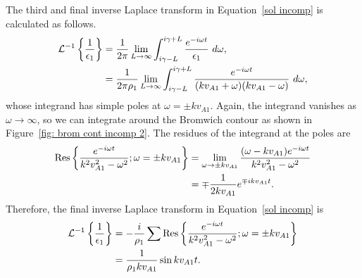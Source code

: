 \documentclass[12pt]{../style-files/ociamthesis}
\begin{document}
The third and final inverse Laplace transform in Equation~\eqref{sol incomp} is calculated as follows.
\begin{align}
\mathcal{L}^{-1}\left\{ \frac{1}{\epsilon_1} \right\} &= \frac{1}{2\pi}\lim_{L \to \infty} \int_{i\gamma - L}^{i\gamma + L} \frac{e^{-i\omega t}}{\epsilon_1} ~d\omega, \notag \\
&= \frac{1}{2\pi\rho_1}\lim_{L \to \infty} \int_{i\gamma - L}^{i\gamma + L} \frac{e^{-i\omega t}}{(kv_{A1} + \omega)(kv_{A1} - \omega)} ~d\omega,
\end{align}
whose integrand has simple poles at $\omega = \pm k v_{A1}$. Again, the integrand vanishes as $\omega \to \infty$, so we can integrate around the Bromwich contour as shown in Figure~\ref{fig: brom cont incomp 2}. The residues of the integrand at the poles are
\begin{align}
\mathrm{Res}\left\{\frac{e^{-i\omega t}}{k^2v_{A1}^2 - \omega^2}; \omega = \pm kv_{A1} \right\} &= 
\lim_{\omega \to \pm kv_{A1}} \frac{(\omega - kv_{A1}) e^{-i\omega t}}{k^2v_{A1}^2 - \omega^2} \notag \\ 
&= \mp \frac{1}{2kv_{A1}} e^{\mp ikv_{A1} t}.
\end{align}
Therefore, the final inverse Laplace transform in Equation~\eqref{sol incomp} is
\begin{align}
\mathcal{L}^{-1}\left\{ \frac{1}{\epsilon_1} \right\} &= -\frac{i}{\rho_1} \sum \mathrm{Res} \left\{ \frac{e^{-i\omega t}}{k^2v_{A1}^2 - \omega^2}; \omega = \pm kv_{A1} \right\} \notag \\
&= \frac{1}{\rho_1kv_{A1}} \sin{kv_{A1}t}.
\end{align}
\end{document}
